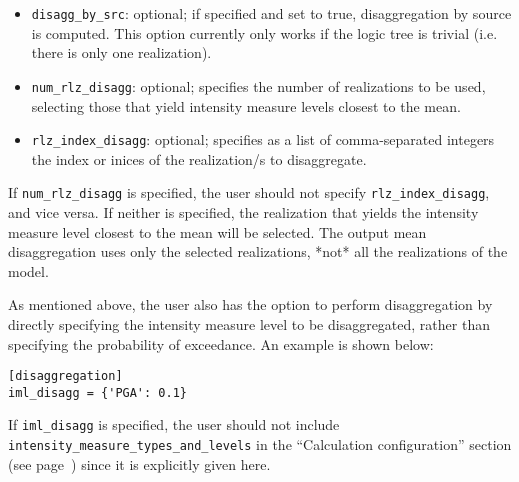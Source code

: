 \begin{itemize}
    \item \Verb+disagg_by_src+: optional; if specified and set to true, disaggregation
    by source is computed. This option currently only works if the logic tree is trivial
    (i.e. there is only one realization).

    \item \Verb+num_rlz_disagg+: optional; specifies the number of realizations to be used, selecting those that yield intensity measure levels closest to the mean.  

    \item \Verb+rlz_index_disagg+: optional; specifies as a list of comma-separated integers the index or inices of the realization/s to disaggregate.

\end{itemize}

If \texttt{num\_rlz\_disagg} is specified, the user should not specify \texttt{rlz\_index\_disagg}, and vice versa. If neither is specified, the realization that yields the intensity measure level closest to the mean will be selected. The output mean disaggregation uses only the selected realizations, *not* all the realizations of the model.  

As mentioned above, the user also has the option to perform disaggregation by
directly specifying the intensity measure level to be disaggregated, rather than
specifying the probability of exceedance. An example is shown below:

\begin{verbatim}
[disaggregation]
iml_disagg = {'PGA': 0.1}
\end{verbatim}

If \texttt{iml\_disagg} is specified, the user should not include
 \texttt{intensity\_measure\_types\_and\_levels} in the
``Calculation configuration'' section (see page~\pageref{sec:calculation_configuration})
since it is explicitly given here.

